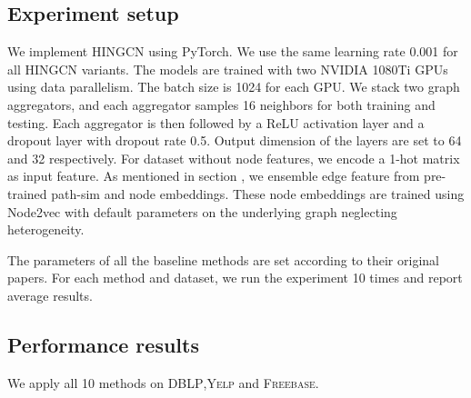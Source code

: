 \subsection{Experiment setup}
\label{sec:setup}
We implement HINGCN using PyTorch. We use the same learning rate 0.001 for all HINGCN variants. The models  are trained with two NVIDIA 1080Ti GPUs using data parallelism. The batch size is 1024 for each GPU. We stack two graph aggregators, and each aggregator samples 16 neighbors for both training and testing. Each aggregator is then followed by a ReLU activation layer and a dropout layer with dropout rate 0.5. Output dimension of the layers are set to 64 and 32 respectively. For dataset without node features, we encode a 1-hot matrix as input feature. As mentioned in section , we ensemble edge feature from pre-trained path-sim and node embeddings. These node embeddings are trained using Node2vec with default parameters on the underlying graph neglecting heterogeneity.

The parameters of all the baseline methods are set according to their original papers.
For each method and dataset,
we run the experiment 10 times and report average results.

\subsection{Performance results}
\label{sec:results}

We apply all 10 methods on \textsc{DBLP},\textsc{Yelp} and \textsc{Freebase}. 

